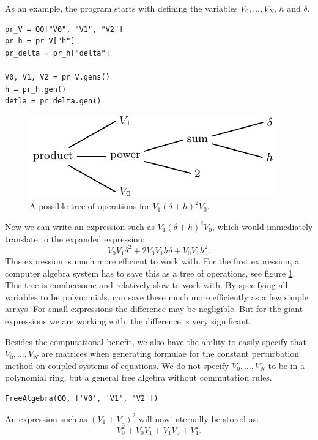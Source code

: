 As an example, the \sage{} program starts with defining the variables $V_0, \dots, V_N$, $h$ and $\delta$.
\begin{verbatim}
pr_V = QQ["V0", "V1", "V2"]
pr_h = pr_V["h"]
pr_delta = pr_h["delta"]

V0, V1, V2 = pr_V.gens()
h = pr_h.gen()
detla = pr_delta.gen()
\end{verbatim}

\begin{figure}
    \begin{center}
        \includegraphics{img/chapter2/sage_operations/tree.pdf}    
    \end{center}
    \caption{A possible tree of operations for $V_1 (\delta+h)^2 V_0$.}\label{fig:c2_operations_tree}
\end{figure}

Now we can write an expression such as $V_1 (\delta + h)^2 V_0$, which \sage{} would immediately translate to the expanded expression:
$$
    V_{0} V_{1} \delta^{2} + 2 V_{0} V_{1} h \delta + V_{0} V_{1} h^{2}\text{.}
$$
This expression is much more efficient to work with. For the first expression, a computer algebra system has to save this as a tree of operations, see figure \ref{fig:c2_operations_tree}. This tree is cumbersome and relatively slow to work with. By specifying all variables to be polynomials, \sage{} can save these much more efficiently as a few simple arrays. For small expressions the difference may be negligible. But for the giant expressions we are working with, the difference is very significant.

Besides the computational benefit, we also have the ability to easily specify that $V_0, \dots, V_N$ are matrices when generating formulae for the constant perturbation method on coupled systems of equations. We do not specify $V_0, \dots, V_N$ to be in a polynomial ring, but a general free algebra without commutation rules.
\begin{verbatim}
FreeAlgebra(QQ, ['V0', 'V1', 'V2'])
\end{verbatim}
An expression such as $(V_1 + V_0)^2$ will now internally be stored as:
$$
    V_{0}^{2} + V_{0} V_{1} + V_{1} V_{0} + V_{1}^{2}\text{.}
$$

